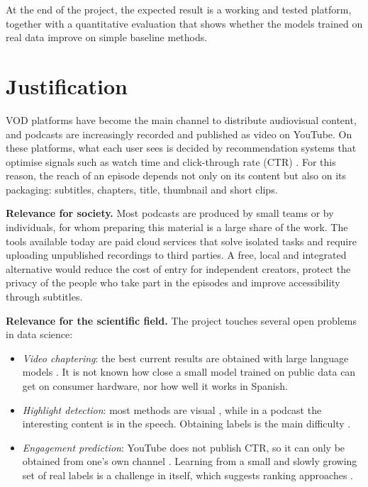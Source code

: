\documentclass[ENG]{TFUOC}
\begin{document}
At the end of the project, the expected result is a working and tested platform, together with a quantitative evaluation that shows whether the models trained on real data improve on simple baseline methods.

\section{Justification}

VOD platforms have become the main channel to distribute audiovisual content, and podcasts are increasingly recorded and published as video on YouTube. On these platforms, what each user sees is decided by recommendation systems that optimise signals such as watch time and click-through rate (CTR) \cite{recommender_systems_streaming, vod_bigdata}. For this reason, the reach of an episode depends not only on its content but also on its packaging: subtitles, chapters, title, thumbnail and short clips.

\textbf{Relevance for society.} Most podcasts are produced by small teams or by individuals, for whom preparing this material is a large share of the work. The tools available today are paid cloud services that solve isolated tasks and require uploading unpublished recordings to third parties. A free, local and integrated alternative would reduce the cost of entry for independent creators, protect the privacy of the people who take part in the episodes and improve accessibility through subtitles.

\textbf{Relevance for the scientific field.} The project touches several open problems in data science:
\begin{itemize}
\item \textit{Video chaptering}: the best current results are obtained with large language models \cite{ventura2025chapterllama}. It is not known how close a small model trained on public data \cite{yang2023vidchapters} can get on consumer hardware, nor how well it works in Spanish.
\item \textit{Highlight detection}: most methods are visual \cite{apostolidis2021survey}, while in a podcast the interesting content is in the speech. Obtaining labels is the main difficulty \cite{sul2023mrhisum}.
\item \textit{Engagement prediction}: YouTube does not publish CTR, so it can only be obtained from one's own channel \cite{yt_data_api}. Learning from a small and slowly growing set of real labels is a challenge in itself, which suggests ranking approaches \cite{burges2005ranknet}.
\end{itemize}
\end{document}
